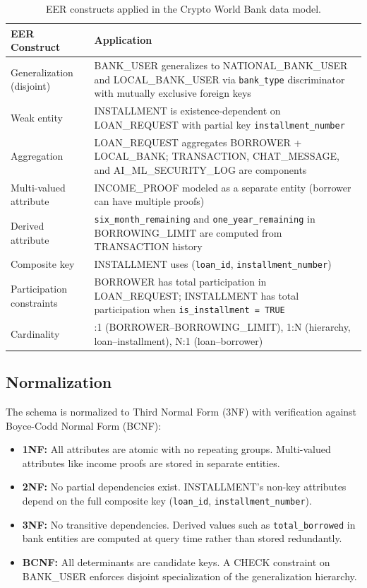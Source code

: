 \documentclass[12pt,a4paper]{report}
\newcommand{\tableheadfont}{\bfseries\small\color{PrimaryBlue}}
\newenvironment{moderntable}[1][H]{%
    \begin{table}[#1]\centering\small%
    \renewcommand{\arraystretch}{1.35}%
}{%
    \end{table}%
}
\begin{document}
\begin{moderntable}
\caption{EER constructs applied in the Crypto World Bank data model.}
\begin{tabular}{@{} >{\raggedright}p{3.2cm} >{\raggedright\arraybackslash}p{9cm} @{}}
\toprule
\tableheadfont EER Construct & \tableheadfont Application \\
\midrule
\rowcolor{RowShade}
Generalization (disjoint) & BANK\_USER generalizes to NATIONAL\_BANK\_USER and LOCAL\_BANK\_USER via \texttt{bank\_type} discriminator with mutually exclusive foreign keys \\
Weak entity & INSTALLMENT is existence-dependent on LOAN\_REQUEST with partial key \texttt{installment\_number} \\
\rowcolor{RowShade}
Aggregation & LOAN\_REQUEST aggregates BORROWER + LOCAL\_BANK; TRANSACTION, CHAT\_MESSAGE, and AI\_ML\_SECURITY\_LOG are components \\
Multi-valued attribute & INCOME\_PROOF modeled as a separate entity (borrower can have multiple proofs) \\
\rowcolor{RowShade}
Derived attribute & \texttt{six\_month\_remaining} and \texttt{one\_year\_remaining} in BORROWING\_LIMIT are computed from TRANSACTION history \\
Composite key & INSTALLMENT uses (\texttt{loan\_id}, \texttt{installment\_number}) \\
\rowcolor{RowShade}
Participation constraints & BORROWER has total participation in LOAN\_REQUEST; INSTALLMENT has total participation when \texttt{is\_installment = TRUE} \\
Cardinality & 1:1 (BORROWER--BORROWING\_LIMIT), 1:N (hierarchy, loan--installment), N:1 (loan--borrower) \\
\bottomrule
\end{tabular}
\end{moderntable}

\subsection{Normalization}

The schema is normalized to Third Normal Form (3NF) with verification against Boyce-Codd Normal Form (BCNF):

\begin{itemize}[noitemsep]
\item \textbf{1NF:} All attributes are atomic with no repeating groups. Multi-valued attributes like income proofs are stored in separate entities.
\item \textbf{2NF:} No partial dependencies exist. INSTALLMENT's non-key attributes depend on the full composite key (\texttt{loan\_id}, \texttt{installment\_number}).
\item \textbf{3NF:} No transitive dependencies. Derived values such as \texttt{total\_borrowed} in bank entities are computed at query time rather than stored redundantly.
\item \textbf{BCNF:} All determinants are candidate keys. A CHECK constraint on BANK\_USER enforces disjoint specialization of the generalization hierarchy.
\end{itemize}
\end{document}
